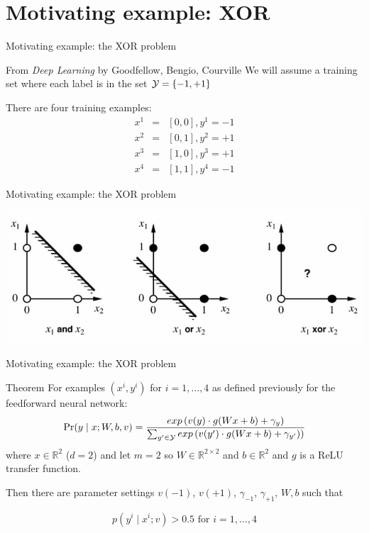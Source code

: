 \section{Motivating example: XOR}
\frame{\tableofcontents[currentsection]}

\begin{frame}{Motivating example: the XOR problem}
\begin{block}{From \textit{Deep Learning} by Goodfellow, Bengio, Courville}
We will assume a training set where each label is in the set ${\cal Y} = \{ -1, +1 \}$

There are four training examples:
\begin{eqnarray*}
x^1 &=& [0,0], y^1 = -1\\
x^2 &=& [0,1], y^2 = +1 \\
x^3 &=& [1,0], y^3 = +1\\
x^4 &=& [1,1], y^4 = -1
\end{eqnarray*}
\end{block}
\end{frame}

\begin{frame}{Motivating example: the XOR problem}
\begin{block}{}
\includegraphics[scale=0.7]{figures/ff/xorfig.png}
\end{block}
\end{frame}

\begin{frame}{Motivating example: the XOR problem}
\begin{block}{Theorem}
For examples $(x^i, y^i)$ for $i = 1,\ldots,4$ as defined previously for the feedforward neural network:
\[ \Pr(y \mid x; W, b, v) = \frac{exp\left(v(y) \cdot g(Wx + b) + \gamma_y \right)}{\sum_{y' \in {\cal Y}} exp\left(v(y') \cdot g(Wx + b) + \gamma_{y'})\right)} \]
where $x \in \mathbb{R}^2$ ($d=2$) and let $m=2$ so $W \in \mathbb{R}^{2\times2}$ and $b \in \mathbb{R}^2$ and $g$ is a ReLU transfer function.

\pause
Then there are parameter settings $v(-1)$, $v(+1)$, $\gamma_{-1}$, $\gamma_{+1}$, $W, b$ such that 

\[ p(y^i \mid x^i; v) > 0.5 \textrm{   for } i = 1, \ldots, 4 \]
\end{block}
\end{frame}

